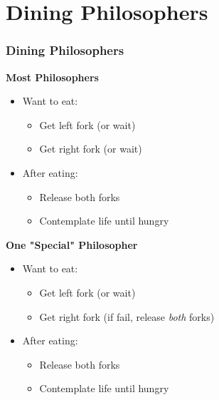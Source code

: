 \documentclass[t, pdftex]{beamer}
\begin{document}
\section{Dining Philosophers}
\begin{frame}[c]
  \frametitle{Dining Philosophers}
  \begin{multicols}{2}
    \textbf{Most Philosophers}
    \begin{itemize}
      \item Want to eat:
      \begin{itemize}
        \item Get left fork (or wait)
        \item Get right fork (or wait)
      \end{itemize}
      \item After eating:
      \begin{itemize}
        \item Release both forks
        \item Contemplate life until hungry
      \end{itemize}
    \end{itemize}
    \columnbreak
    \textbf{One "Special" Philosopher}
    \begin{itemize}
      \item Want to eat:
      \begin{itemize}
        \item Get left fork (or wait)
        \item Get right fork (if fail, release \textit{both} forks)
      \end{itemize}
      \item After eating:
      \begin{itemize}
        \item Release both forks
        \item Contemplate life until hungry
      \end{itemize}
    \end{itemize}
  \end{multicols}
\end{frame}
\end{document}
